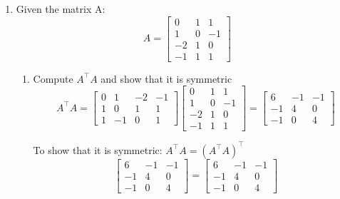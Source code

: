 \documentclass[11pt]{article}
\begin{document}
\begin{enumerate}
\item Given the matrix A:
\[
    A = \begin{bmatrix}
        0 & 1 & 1 \\
        1 & 0 & -1 \\
        -2 & 1 & 0 \\
        -1 & 1 & 1
    \end{bmatrix}
\]
\begin{enumerate}
\item Compute \(A^\top A\) and show that it is symmetric
\[
    A^\top A = \begin{bmatrix}
        0 & 1 & -2 & -1 \\
        1 & 0 & 1 & 1 \\
        1 & -1 & 0 & 1
    \end{bmatrix}
    \begin{bmatrix}
        0 & 1 & 1 \\
        1 & 0 & -1 \\
        -2 & 1 & 0 \\
        -1 & 1 & 1
    \end{bmatrix}
    = \begin{bmatrix}
        6 & -1 & -1 \\
        -1 & 4 & 0 \\
        -1 & 0 & 4
    \end{bmatrix}
\]

To show that it is symmetric: \(A^\top A = (A^\top A)^\top\)
\[
    \begin{bmatrix}
        6 & -1 & -1 \\
        -1 & 4 & 0 \\
        -1 & 0 & 4
    \end{bmatrix}
    = \begin{bmatrix}
        6 & -1 & -1 \\
        -1 & 4 & 0 \\
        -1 & 0 & 4
    \end{bmatrix}
\]


\end{enumerate}
\end{enumerate}
\end{document}
